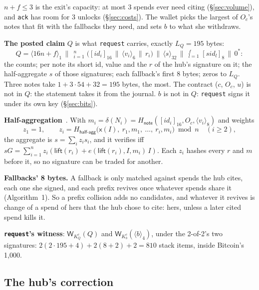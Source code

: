 \documentclass[11pt]{article}
\theoremstyle{plain}
\theoremstyle{definition}
\newcommand{\tx}[1]{\texttt{#1}}
\newcommand{\be}[2]{\langle #1\rangle_{#2}}
\newcommand{\pre}[2]{[#1]_{#2}}
\newcommand{\xo}[1]{\mathsf{x}(#1)}
\newcommand{\Ht}[1]{H_{\textsf{#1}}}
\newcommand{\Wots}{\mathsf{W}}
\newcommand{\sid}{\mathit{sid}}
\newcommand{\Oc}{O_c}
\newcommand{\KQ}{K_{Q}^{c}}
\newcommand{\Kb}{K_{b}^{c}}
\begin{document}
$n + f \le 3$ is the exit's capacity: at most 3 spends ever need citing
(\S\ref{sec:volume}), and \tx{ack} has room for 3 unlocks
(\S\ref{sec:costs}). The wallet picks the largest of $\Oc$'s notes that
fit with the fallbacks they need, and sets $b$ to what she withdraws.

\textbf{The posted claim} $Q$ is what \tx{request} carries, exactly
$L_Q = 195$ bytes:
\[
  Q = \be{16n + f}{1} \,\big\|\, \mathop{\big\|}_{i=1}^{n}
  \big(\pre{\mathit{id}_i}{16} \,\|\, \be{v_i}{6} \,\|\, r_i\big)
  \,\big\|\, \be{s}{32} \,\big\|\, \mathop{\big\|}_{l=1}^{f} \pre{\sid_l}{8}
  \,\big\|\, 0^{\ast}:
\]
the counts; per note its short id, value and the $r$ of the hub's
signature on it; the half-aggregate $s$ of those signatures; each
fallback's first 8 bytes; zeros to $L_Q$. Three notes take $1 + 3 \cdot
54 + 32 = 195$ bytes, the most. The contract ($c$, $\Oc$, $u$) is not in
$Q$: the statement takes it from the journal. $b$ is not in $Q$:
\tx{request} signs it under its own key (\S\ref{sec:bits}).

\textbf{Half-aggregation}~\cite{halfagg1,halfagg2}. With $m_i =
\delta(N_i) = \Ht{note}(\pre{\mathit{id}_i}{16}, \Oc, \be{v_i}{8})$ and
weights
\[
  z_1 = 1,\qquad z_i = \Ht{half-agg}\big(\xo{I},\ r_1, m_1,\ \dots,\ r_i,
  m_i\big) \bmod n \quad (i \ge 2),
\]
the aggregate is $s = \sum_i z_i s_i$, and it verifies iff $sG =
\sum_{i=1}^n z_i(\mathsf{lift}(r_i) + e(\mathsf{lift}(r_i), I, m_i)\,I)$.
Each $z_i$ hashes every $r$ and $m$ before it, so no signature can be
traded for another.

\textbf{Fallbacks' 8 bytes.} A fallback is only matched against spends
the hub cites, each one she signed, and each prefix revives once
whatever spends share it (Algorithm~1). So a prefix collision adds no
candidates, and whatever it revives is change of a spend of hers that
the hub chose to cite: hers, unless a later cited spend kills it.

\textbf{\tx{request}'s witness}: $\Wots_{\KQ}(Q)$ and
$\Wots_{\Kb}(\be{b}{4})$, under the 2-of-2's two signatures: $2(2 \cdot
195 + 4) + 2(8 + 2) + 2 = 810$ stack items, inside Bitcoin's 1,000.

\subsection{The hub's correction}\label{sec:correct}
\end{document}
